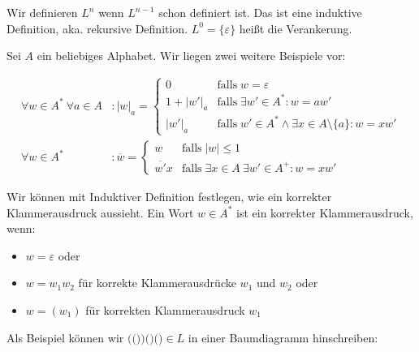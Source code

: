 \documentclass[12pt,a4paper,oneside]{article}
\newcommand{\emptyline}{\hspace*{\fill}}
\newcommand{\If}[1]{\text{falls}\; #1}
\begin{document}
            Wir definieren $L^n$ wenn $L^{n-1}$ schon definiert ist.
            Das ist eine induktive Definition, aka. rekursive Definition.
            $L^0 = \{\varepsilon\}$ heißt die Verankerung.

            \emptyline

            Sei $A$ ein beliebiges Alphabet.
            Wir liegen zwei weitere Beispiele vor:

            \vspace{-1em}
            \begin{align*}
                \forall w \in A^*\ \forall a \in A&: |w|_a =
                \begin{cases}
                    0          &\If{w = \varepsilon} \\
                    1 + |w'|_a &\If{\exists w' \in A^*: w = aw'} \\
                    |w'|_a     &\If{w' \in A^* \wedge \exists x \in A \setminus \{a\}: w = xw'}
                \end{cases} \\
                \forall w \in A^*&: \overline{w} =
                \begin{cases}
                    w              &\If{|w| \leq 1} \\
                    \overline{w'}x &\If{\exists x \in A\ \exists w' \in A^+: w = xw'}
                \end{cases}
            \end{align*}

            Wir können mit Induktiver Definition festlegen, wie ein korrekter Klammerausdruck aussieht.
            Ein Wort $w \in A^*$ ist ein korrekter Klammerausdruck, wenn:

            \begin{itemize}
                \item $w = \varepsilon$ oder
                \item $w = w_1 w_2$ für korrekte Klammerausdrücke $w_1$ und $w_2$ oder
                \item $w = (w_1)$ für korrekten Klammerausdruck $w_1$
            \end{itemize}

            Als Beispiel können wir $\texttt{(())()()} \in L$ in einer Baumdiagramm hinschreiben:
\end{document}
